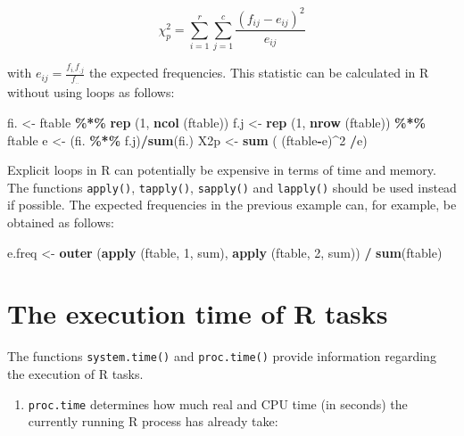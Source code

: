 \documentclass[
]{book}
\newenvironment{Shaded}{\begin{snugshade}}{\end{snugshade}}
\newcommand{\DecValTok}[1]{\textcolor[rgb]{0.00,0.00,0.81}{#1}}
\newcommand{\FunctionTok}[1]{\textcolor[rgb]{0.13,0.29,0.53}{\textbf{#1}}}
\newcommand{\NormalTok}[1]{#1}
\newcommand{\OtherTok}[1]{\textcolor[rgb]{0.56,0.35,0.01}{#1}}
\newcommand{\SpecialCharTok}[1]{\textcolor[rgb]{0.81,0.36,0.00}{\textbf{#1}}}
\providecommand{\tightlist}{%
  \setlength{\itemsep}{0pt}\setlength{\parskip}{0pt}}
\begin{document}
\[
\chi^2_p = \sum_{i=1}^r \sum_{j=1}^c \frac{(f_{ij}-e_{ij})^2}{e_{ij}}
\]

with \(e_{ij} = \frac{f_{i.}f_{.j}}{f_{..}}\) the expected frequencies. This statistic can be calculated in R without using loops as follows:

\begin{Shaded}
\begin{Highlighting}[]
\NormalTok{fi. }\OtherTok{\textless{}{-}}\NormalTok{ ftable }\SpecialCharTok{\%*\%} \FunctionTok{rep}\NormalTok{ (}\DecValTok{1}\NormalTok{, }\FunctionTok{ncol}\NormalTok{ (ftable))}
\NormalTok{f.j }\OtherTok{\textless{}{-}} \FunctionTok{rep}\NormalTok{ (}\DecValTok{1}\NormalTok{, }\FunctionTok{nrow}\NormalTok{ (ftable)) }\SpecialCharTok{\%*\%}\NormalTok{ ftable}
\NormalTok{e }\OtherTok{\textless{}{-}}\NormalTok{ (fi. }\SpecialCharTok{\%*\%}\NormalTok{ f.j)}\SpecialCharTok{/}\FunctionTok{sum}\NormalTok{(fi.)}
\NormalTok{X2p }\OtherTok{\textless{}{-}} \FunctionTok{sum}\NormalTok{ ( (ftable}\SpecialCharTok{{-}}\NormalTok{e)}\SpecialCharTok{\^{}}\DecValTok{2} \SpecialCharTok{/}\NormalTok{e)}
\end{Highlighting}
\end{Shaded}

Explicit loops in R can potentially be expensive in terms of time and memory. The functions \texttt{apply()}, \texttt{tapply()}, \texttt{sapply()} and \texttt{lapply()} should be used instead if possible. The expected frequencies in the previous example can, for example, be obtained as follows:

\begin{Shaded}
\begin{Highlighting}[]
\NormalTok{e.freq }\OtherTok{\textless{}{-}} \FunctionTok{outer}\NormalTok{ (}\FunctionTok{apply}\NormalTok{ (ftable, }\DecValTok{1}\NormalTok{, sum),  }\FunctionTok{apply}\NormalTok{ (ftable, }\DecValTok{2}\NormalTok{, sum)) }\SpecialCharTok{/} \FunctionTok{sum}\NormalTok{(ftable)}
\end{Highlighting}
\end{Shaded}

\section{The execution time of R tasks}\label{the-execution-time-of-r-tasks}

The functions \texttt{system.time()} and \texttt{proc.time()} provide information regarding the execution of R tasks.

\begin{enumerate}
\def\labelenumi{(\alph{enumi})}
\tightlist
\item
  \texttt{proc.time} determines how much real and CPU time (in seconds) the currently running R process has already take:
\end{enumerate}
\end{document}
